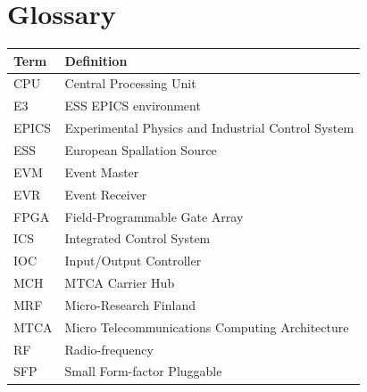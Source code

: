 \documentclass[11pt
  , a4paper
  , article
  , oneside
  , showtrims
]{memoir}
\begin{document}
\chapter*{Glossary}\label{sec:glossary}
\begin{table}[!htb]
  \begin{tabular}{ll}
    \toprule
    \textbf{Term} & Definition                                          \\\midrule
    CPU           & Central Processing Unit                             \\
    E3            & ESS EPICS environment                               \\
    EPICS         & Experimental Physics and Industrial Control System  \\
    ESS           & European Spallation Source                          \\
    EVM           & Event Master                                        \\
    EVR           & Event Receiver                                      \\
    FPGA          & Field-Programmable Gate Array                       \\
    ICS           & Integrated Control System                           \\
    IOC           & Input/Output Controller                             \\
    MCH           & MTCA Carrier Hub                                    \\
    MRF           & Micro-Research Finland                               \\
    MTCA          & Micro Telecommunications Computing Architecture     \\
    RF            & Radio-frequency                                     \\
    SFP           & Small Form-factor Pluggable                         \\
    \bottomrule
  \end{tabular}
  \label{table:glossary}
\end{table}
\end{document}
